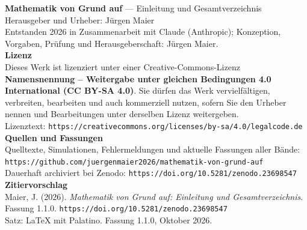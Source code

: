 \thispagestyle{empty}
\vspace*{\fill}
\begin{flushleft}
{\small\color{grau}
\textbf{\color{tief}Mathematik von Grund auf} --- Einleitung und Gesamtverzeichnis\\[14pt]

Herausgeber und Urheber: Jürgen Maier\\[2pt]
Entstanden 2026 in Zusammenarbeit mit Claude (Anthropic); Konzeption, Vorgaben, Prüfung und Herausgeberschaft: Jürgen Maier.\\[14pt]

\textbf{Lizenz}\\[2pt]
Dieses Werk ist lizenziert unter einer Creative-Commons-Lizenz \textbf{Namensnennung -- Weitergabe unter gleichen Bedingungen 4.0 International (CC BY-SA 4.0)}. Sie dürfen das Werk vervielfältigen, verbreiten, bearbeiten und auch kommerziell nutzen, sofern Sie den Urheber nennen und Bearbeitungen unter derselben Lizenz weitergeben.\\[2pt]
Lizenztext: \texttt{https://creativecommons.org/licenses/by-sa/4.0/legalcode.de}\\[14pt]

\textbf{Quellen und Fassungen}\\[2pt]
Quelltexte, Simulationen, Fehlermeldungen und aktuelle Fassungen aller Bände:\\
\texttt{https://github.com/juergenmaier2026/mathematik-von-grund-auf}\\[2pt]
Dauerhaft archiviert bei Zenodo: \texttt{https://doi.org/10.5281/zenodo.23698547}\\[14pt]

\textbf{Zitiervorschlag}\\[2pt]
Maier, J. (2026). \textit{Mathematik von Grund auf: Einleitung und Gesamtverzeichnis}. Fassung 1.1.0. \texttt{https://doi.org/10.5281/zenodo.23698547}\\[14pt]

Satz: \LaTeX{} mit Palatino. Fassung 1.1.0, Oktober 2026.
}
\end{flushleft}
\vspace*{1.5cm}
